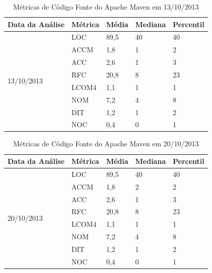 \begin{apendicesenv}
\begin{table}[ht]
\centering
\begin{tabular}{|l|l|l|l|l|}
\hline
Data da Análise             & Métrica & Média & Mediana & Percentil \\ \hline
\multirow{8}{*}{13/10/2013} & LOC     & 89,5  & 40      & 40        \\ \cline{2-5} 
                            & ACCM    & 1,8   & 1       & 2         \\ \cline{2-5} 
                            & ACC     & 2,6   & 1       & 3         \\ \cline{2-5} 
                            & RFC     & 20,8  & 8       & 23        \\ \cline{2-5} 
                            & LCOM4   & 1,1   & 1       & 1         \\ \cline{2-5} 
                            & NOM     & 7,2   & 4       & 8         \\ \cline{2-5} 
                            & DIT     & 1,2   & 1       & 2         \\ \cline{2-5} 
                            & NOC     & 0,4   & 0       & 1         \\ \hline
\end{tabular}
\label{13/10}
\caption{Métricas de Código Fonte do Apache Maven em 13/10/2013}
\end{table}



\begin{table}[ht]
\centering
\begin{tabular}{|l|l|l|l|l|}
\hline
Data da Análise             & Métrica & Média & Mediana & Percentil \\ \hline
\multirow{8}{*}{20/10/2013} & LOC     & 89,5  & 40      & 40        \\ \cline{2-5} 
                            & ACCM    & 1,8   & 2       & 2         \\ \cline{2-5} 
                            & ACC     & 2,6   & 1       & 3         \\ \cline{2-5} 
                            & RFC     & 20,8  & 8       & 23        \\ \cline{2-5} 
                            & LCOM4   & 1,1   & 1       & 1         \\ \cline{2-5} 
                            & NOM     & 7,2   & 4       & 8         \\ \cline{2-5} 
                            & DIT     & 1,2   & 1       & 2         \\ \cline{2-5} 
                            & NOC     & 0,4   & 0       & 1         \\ \hline
\end{tabular}
\label{20/10}
\caption{Métricas de Código Fonte do Apache Maven em 20/10/2013}
\end{table}



\end{apendicesenv}
